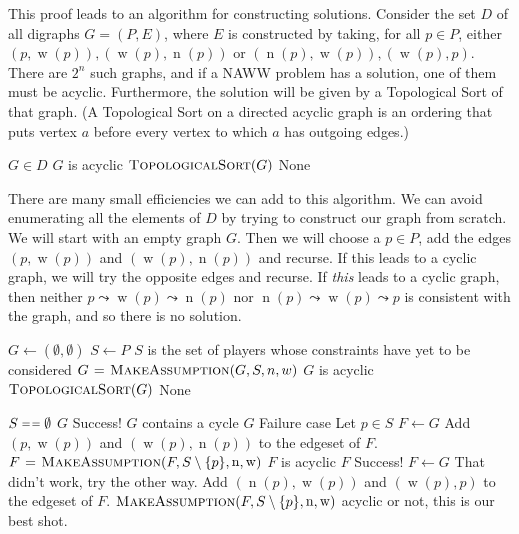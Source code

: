 \documentclass[12pt,x11names, rgb]{article}
\DeclareMathOperator{\w}{w}
\DeclareMathOperator{\n}{n}
\begin{document}
    This proof leads to an algorithm for constructing solutions. Consider the set $D$ of all digraphs $G=(P,E)$, where $E$ is constructed by taking, for all $p \in P$, either  $(p,\w(p)), (\w(p),\n(p))$ or $(\n(p),\w(p)),(\w(p),p)$. There are $2^n$ such graphs, and if a NAWW problem has a solution, one of them must be acyclic. Furthermore, the solution will be given by a Topological Sort of that graph. (A Topological Sort on a directed acyclic graph is an ordering that puts vertex $a$ before every vertex to which $a$ has outgoing edges.)

    \begin{codebox}
    \li \For $G\in D$
    \li     \Do
            \If $G$ is acyclic
    \li         \Do
                    \Return $\textnormal{\scshape TopologicalSort}(G)$
            \End
        \End
    \li \Return None
    \end{codebox}
        
    There are many small efficiencies we can add to this algorithm. We can avoid enumerating all the elements of $D$ by trying to construct our graph from scratch. We will start with an empty graph $G$. Then we will choose a $p \in P$, add the edges $(p,\w(p))$ and $(\w(p),\n(p))$ and recurse. If this leads to a cyclic graph, we will try the opposite edges and recurse. If \emph{this} leads to a cyclic graph, then neither $p \leadsto \w(p) \leadsto \n(p)$ nor $\n(p) \leadsto \w(p) \leadsto p$ is consistent with the graph, and so there is no solution.

    \begin{codebox}
    \li $G \gets (\emptyset, \emptyset)$
    \li $S \gets P$ \> \> \Comment $S$ is the set of players whose constraints have yet to be considered
    \li $G \mathrel{\hspace{1pt}=\hspace{1pt}} \textnormal{\scshape MakeAssumption}(G,S,n,w)$
    \li \If $G$ is acyclic
    \li     \Do
            \Return $\textnormal{\scshape TopologicalSort}(G)$
        \End
    \li \Return None
    \end{codebox}


    \begin{codebox}
    \Procname{$\proc{MakeAssumption}(G,S,\n,\w)$}
    \li \If $S \isequal \emptyset$
    \li     \Then
            \Return $G$ \Comment Success!
        \End
    \li \If $G$ contains a cycle
    \li     \Then
            \Return $G$ \Comment Failure case
        \End
    \li Let $p \in S$
    \li $F \gets G$
    \li Add $(p,\w(p))$ and $(\w(p),\n(p))$ to the edgeset of $F$.
    \li $F \gets \proc{MakeAssumption}(F,S\setminus \{p\}, \n, \w)$
    \li \If $F$ is acyclic
    \li     \Do
            \Return $F$ \Comment Success!
        \End
    \li $F \gets G$ \Comment That didn't work, try the other way.
    \li Add $(\n(p),\w(p))$ and $(\w(p),p)$ to the edgeset of $F$.
    \li \Return $\proc{MakeAssumption}(F,S\setminus \{p\}, \n, \w)$ \Comment acyclic or not, this is our best shot.
    \end{codebox}
\end{document}
